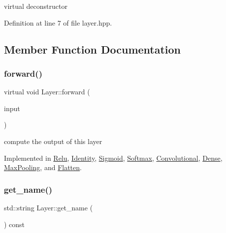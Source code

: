 virtual deconstructor 



Definition at line 7 of file layer.\+hpp.



\subsection{Member Function Documentation}
\mbox{\label{class_layer_ac0b116d692ea457f8e7c0f79f7159004}} 
\subsubsection{\texorpdfstring{forward()}{forward()}}
{\footnotesize\ttfamily virtual void Layer\+::forward (\begin{DoxyParamCaption}\item[{std\+::vector$<$ Eigen\+::\+Matrix\+Xd $>$}]{input }\end{DoxyParamCaption})\hspace{0.3cm}{\ttfamily [pure virtual]}}



compute the output of this layer 



Implemented in \hyperlink{class_relu_affdc902d266350bc024e31836fa2395b}{Relu}, \hyperlink{class_identity_af202a7a325b2db8939e00673877c6b2e}{Identity}, \hyperlink{class_sigmoid_adc63e77cbdcd74d1d4c452514a173c69}{Sigmoid}, \hyperlink{class_softmax_a50805d8a6bc976b1ce73c3d87e1a2d5c}{Softmax}, \hyperlink{class_convolutional_ae52748139bd1a17a77525290086d8ad8}{Convolutional}, \hyperlink{class_dense_a8352bde317b3f33c033a36ce9b9e3c0e}{Dense}, \hyperlink{class_max_pooling_ae8556d4b6e3b583d02386b9b71b53a80}{Max\+Pooling}, and \hyperlink{class_flatten_acc0cfdfd9736b2908dae4ccf2006df02}{Flatten}.

\mbox{\label{class_layer_a1de20564b34204c4b3e985f48c69d17f}} 
\subsubsection{\texorpdfstring{get\+\_\+name()}{get\_name()}}
{\footnotesize\ttfamily std\+::string Layer\+::get\+\_\+name (\begin{DoxyParamCaption}{ }\end{DoxyParamCaption}) const}



